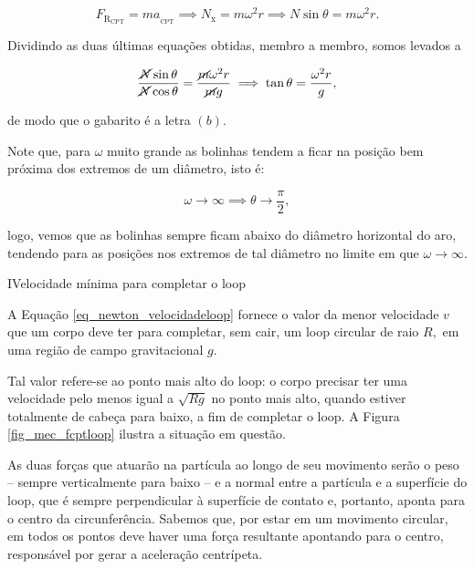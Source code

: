 \begin{exemplo}
$$ F_{\text{R}_\text{CPT}} = m a_{\text{}_\text{CPT}} \implies N_\text{x} = m \omega^2r \implies \boxed{N \sin \theta = m \omega^2r.} $$

Dividindo as duas últimas equações obtidas, membro a membro, somos levados a

$$ \dfrac{\cancel N \sin \theta}{\cancel N \cos \theta} = \dfrac{\cancel m \omega^2 r}{\cancel m g} \implies \tan \theta = \dfrac{\omega^2r}{g}, $$

\noindent de modo que o gabarito é a letra $(b).$

Note que, para $\omega$ muito grande as bolinhas tendem a ficar na posição bem próxima dos extremos de um diâmetro, isto é:

$$ \omega \to \infty \implies \theta \to \dfrac{\pi}{2},$$

\noindent logo, vemos que as bolinhas sempre ficam abaixo do diâmetro horizontal do aro, tendendo para as posições nos extremos de tal diâmetro no limite em que $ \omega \to \infty.$



\end{exemplo}



\begin{secnivel}{I}{Velocidade mínima para completar o loop}
  

\end{secnivel}








A Equação \eqref{eq_newton_velocidadeloop} fornece o valor da menor velocidade $v$ que um corpo deve ter para completar, sem cair, um loop circular de raio $R,$ em uma região de campo gravitacional $g$.

Tal valor refere-se ao ponto mais alto do loop: o corpo precisar ter uma velocidade pelo menos igual a $\sqrt{Rg}$ no ponto mais alto, quando estiver totalmente de cabeça para baixo, a fim de completar o loop. A Figura \ref{fig_mec_fcptloop} ilustra a situação em questão.

As duas forças que atuarão na partícula ao longo de seu movimento serão o peso -- sempre verticalmente para baixo -- e a normal entre a partícula e a superfície do loop, que é sempre perpendicular à superfície de contato e, portanto, aponta para o centro da circunferência. Sabemos que, por estar em um movimento circular, em todos os pontos deve haver uma força resultante apontando para o centro, responsável por gerar a aceleração centrípeta.

